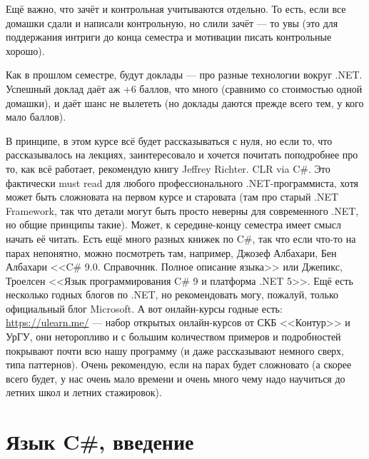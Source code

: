 \documentclass{../../text-style}
\begin{document}
Ещё важно, что зачёт и контрольная учитываются отдельно. То есть, если все домашки сдали и написали контрольную, но слили зачёт --- то увы (это для поддержания интриги до конца семестра и мотивации писать контрольные хорошо).

Как в прошлом семестре, будут доклады --- про разные технологии вокруг .NET. Успешный доклад даёт аж +6 баллов, что много (сравнимо со стоимостью одной домашки), и даёт шанс не вылететь (но доклады даются прежде всего тем, у кого мало баллов).

В принципе, в этом курсе всё будет рассказываться с нуля, но если то, что рассказывалось на лекциях, заинтересовало и хочется почитать поподробнее про то, как всё работает, рекомендую книгу Jeffrey Richter. CLR via C\#. Это фактически must read для любого профессионального .NET-программиста, хотя может быть сложновата на первом курсе и старовата (там про старый .NET Framework, так что детали могут быть просто неверны для современного .NET, но общие принципы такие). Может, к середине-концу семестра имеет смысл начать её читать. Есть ещё много разных книжек по C\#, так что если что-то на парах непонятно, можно посмотреть там, например, Джозеф Албахари, Бен Албахари <<C\# 9.0. Справочник. Полное описание языка>> или Джепикс, Троелсен <<Язык программирования C\# 9 и платформа .NET 5>>. Ещё есть несколько годных блогов по .NET, но рекомендовать могу, пожалуй, только официальный блог Microsoft. А вот онлайн-курсы годные есть: \url{https://ulearn.me/} --- набор открытых онлайн-курсов от СКБ <<Контур>> и УрГУ, они неторопливо и с большим количеством примеров и подробностей покрывают почти всю нашу программу (и даже рассказывают немного сверх, типа паттернов). Очень рекомендую, если на парах будет сложновато (а скорее всего будет, у нас очень мало времени и очень много чему надо научиться до летних школ и летних стажировок).

\section{Язык C\#, введение}
\end{document}
